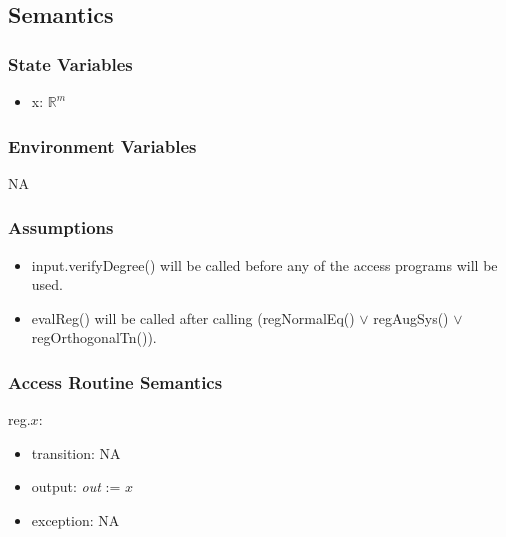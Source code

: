 \documentclass[12pt, titlepage]{article}
\begin{document}

\subsection{Semantics}

\subsubsection{State Variables}
\begin{itemize}

\item x: $\mathbb{R}^m$\\
\end{itemize}


\subsubsection{Environment Variables}

NA

\subsubsection{Assumptions}
\begin{itemize}
\item input.verifyDegree() will be called before any of the access programs 
will be used.
\item evalReg() will be called after calling (regNormalEq() $\lor$  
regAugSys() $\lor$ regOrthogonalTn()).
\end{itemize}
\subsubsection{Access Routine Semantics}

\noindent reg.$x$:
\begin{itemize}
	\item transition: NA	
	\item output: \textit{out} := $x$
	\item exception: NA
\end{itemize}
\end{document}
